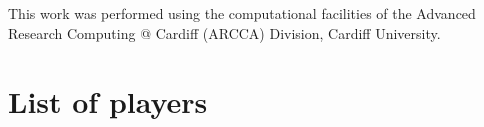 \documentclass{article}
\begin{document}
This work was performed using the computational facilities of the Advanced
Research Computing @ Cardiff (ARCCA) Division, Cardiff University.

\printbibliography

\appendix

\section{List of players}\label{app:list_of_players}

\begin{multicols}{3}
	\begin{enumerate}
		
	\end{enumerate}
\end{multicols}
\end{document}
